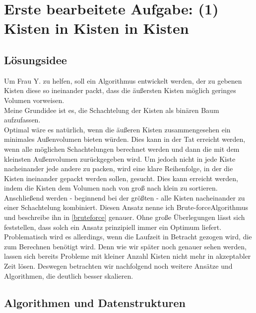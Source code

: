 \lstset{language=Scala}
\chapter{Erste bearbeitete Aufgabe: (1) Kisten in Kisten in Kisten}
\minitoc
\clearpage
\section{Lösungsidee}
 Um Frau Y. zu helfen, soll ein Algorithmus entwickelt werden, der zu gebenen Kisten diese so ineinander packt,
 dass die äußersten Kisten möglich geringes Volumen vorweisen.\\
 Meine Grundidee ist es, die Schachtelung der Kisten als binären Baum aufzufassen.\\
 Optimal wäre es natürlich, wenn die äußeren Kisten zusammengesehen ein minimales Außenvolumen bieten würden.
 Dies kann in der Tat erreicht werden, wenn alle möglichen Schachtelungen berechnet werden und dann die mit dem kleinsten Außenvolumen zurückgegeben wird.
 Um jedoch nicht in jede Kiste nacheinander jede andere zu packen, wird eine klare Reihenfolge, in der die Kisten ineinander gepackt werden sollen, gesucht.
 Dies kann erreicht werden, indem die Kisten dem Volumen nach von groß nach klein zu sortieren.
 Anschließend werden - beginnend bei der größten - alle Kisten nacheinander zu einer Schachtelung kombiniert.
 Diesen Ansatz nenne ich Brute-force\-Algorithmus und beschreibe ihn in \ref{bruteforce} genauer.
 Ohne große Überlegungen lässt sich feststellen, dass solch ein Ansatz prinzipiell immer ein Optimum liefert.
 Problematisch wird es allerdings, wenn die Laufzeit in Betracht gezogen wird, die zum Berechnen benötigt wird.
 Denn wie wir später noch genauer sehen werden, lassen sich bereits Probleme mit kleiner Anzahl Kisten nicht mehr in akzeptabler Zeit lösen.
 Deswegen betrachten wir nachfolgend noch weitere Ansätze und Algorithmen, die deutlich besser skalieren.
\section{Algorithmen und Datenstrukturen}
